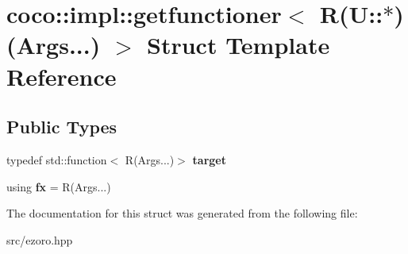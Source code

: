 \hypertarget{structcoco_1_1impl_1_1getfunctioner_3_01_r_07_u_1_1_5_08_07_args_8_8_8_08_01_4}{\section{coco\-:\-:impl\-:\-:getfunctioner$<$ R(U\-:\-:$\ast$)(Args...) $>$ Struct Template Reference}
\label{structcoco_1_1impl_1_1getfunctioner_3_01_r_07_u_1_1_5_08_07_args_8_8_8_08_01_4}
}
\subsection*{Public Types}
\begin{DoxyCompactItemize}
\item 
\hypertarget{structcoco_1_1impl_1_1getfunctioner_3_01_r_07_u_1_1_5_08_07_args_8_8_8_08_01_4_aef261d7a62b54d064177787cff33336f}{typedef std\-::function$<$ R(Args...)$>$ {\bfseries target}}\label{structcoco_1_1impl_1_1getfunctioner_3_01_r_07_u_1_1_5_08_07_args_8_8_8_08_01_4_aef261d7a62b54d064177787cff33336f}

\item 
\hypertarget{structcoco_1_1impl_1_1getfunctioner_3_01_r_07_u_1_1_5_08_07_args_8_8_8_08_01_4_a2490959e1992e8ec9903d0ec253c7cfc}{using {\bfseries fx} = R(Args...)}\label{structcoco_1_1impl_1_1getfunctioner_3_01_r_07_u_1_1_5_08_07_args_8_8_8_08_01_4_a2490959e1992e8ec9903d0ec253c7cfc}

\end{DoxyCompactItemize}


The documentation for this struct was generated from the following file\-:\begin{DoxyCompactItemize}
\item 
src/ezoro.\-hpp\end{DoxyCompactItemize}
